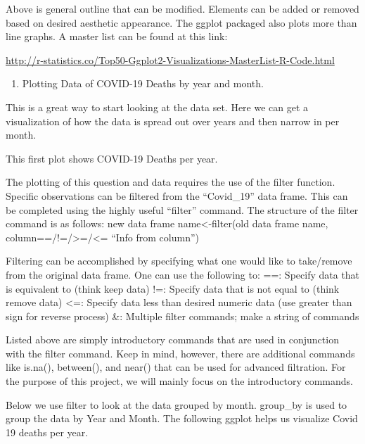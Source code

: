 \documentclass[
]{article}
\providecommand{\tightlist}{%
  \setlength{\itemsep}{0pt}\setlength{\parskip}{0pt}}
\begin{document}
Above is general outline that can be modified. Elements can be added or
removed based on desired aesthetic appearance. The ggplot packaged also
plots more than line graphs. A master list can be found at this link:

\url{http://r-statistics.co/Top50-Ggplot2-Visualizations-MasterList-R-Code.html}

\begin{enumerate}
\def\labelenumi{\arabic{enumi}.}
\tightlist
\item
  Plotting Data of COVID-19 Deaths by year and month.
\end{enumerate}

This is a great way to start looking at the data set. Here we can get a
visualization of how the data is spread out over years and then narrow
in per month.

This first plot shows COVID-19 Deaths per year.

The plotting of this question and data requires the use of the filter
function. Specific observations can be filtered from the ``Covid\_19''
data frame. This can be completed using the highly useful ``filter''
command. The structure of the filter command is as follows: new data
frame name\textless-filter(old data frame name,
column==/!=/\textgreater=/\textless= ``Info from column'')

Filtering can be accomplished by specifying what one would like to
take/remove from the original data frame. One can use the following to:
==: Specify data that is equivalent to (think keep data) !=: Specify
data that is not equal to (think remove data) \textless=: Specify data
less than desired numeric data (use greater than sign for reverse
process) \&: Multiple filter commands; make a string of commands

Listed above are simply introductory commands that are used in
conjunction with the filter command. Keep in mind, however, there are
additional commands like is.na(), between(), and near() that can be used
for advanced filtration. For the purpose of this project, we will mainly
focus on the introductory commands.

Below we use filter to look at the data grouped by month. group\_by is
used to group the data by Year and Month. The following ggplot helps us
visualize Covid 19 deaths per year.
\end{document}
